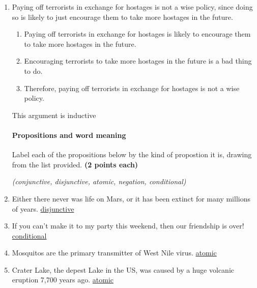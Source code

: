 \documentclass[10pt]{article}
\begin{document}
\begin{enumerate}
  \item Paying off terrorists in exchange for hostages is not a wise policy, since doing so is likely to just encourage them to take more hostages in the future.
  
  \vspace{2mm}
  \begin{enumerate}
   \item Paying off terrorists in exchange for hostages is likely to encourage them to take more hostages in the future.
   \item Encouraging terrorists to take more hostages in the future is a bad thing to do.
   \item Therefore, paying off terrorists in exchange for hostages is not a wise policy.
  \end{enumerate}
  This argument is inductive
  \vspace{2mm}
  

\paragraph{Propositions and word meaning}

Label each of the propositions below by the kind of propostion it is, drawing from the list provided. \textbf{(2 points each)}

\begin{center}\textit{(conjunctive, disjunctive, atomic, negation, conditional)}\end{center}

  \item Either there never was life on Mars, or it has been extinct for many millions of years. \underline{  disjunctive  }
  
  \item If you can't make it to my party this weekend, then our friendship is over! \underline{  conditional  }
  
  \item Mosquitos are the primary transmitter of West Nile virus. \underline{  atomic  }
  
  \item Crater Lake, the depest Lake in the US, was caused by a huge volcanic eruption 7,700 years ago. \underline{  atomic  }
  

\vspace{0.5cm}


\end{enumerate}
\end{document}
